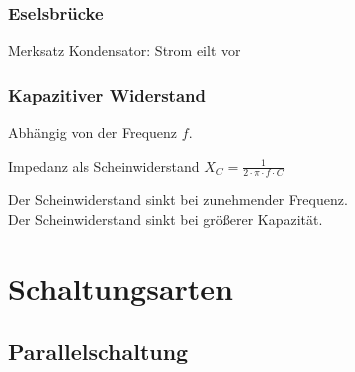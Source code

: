 \begin{frame}
  \frametitle{Eselsbrücke}
  \begin{block}{Merksatz}
    Kondensator: Strom eilt vor
  \end{block}
\end{frame}

\begin{frame}
  \frametitle{Kapazitiver Widerstand}

  Abhängig von der Frequenz $f$.

  \begin{block}{Impedanz als Scheinwiderstand}
    \huge{$X_C = \frac{1}{2 \cdot \pi \cdot f \cdot C}$}
  \end{block}

  \pause
  Der Scheinwiderstand sinkt bei zunehmender Frequenz.\\
  Der Scheinwiderstand sinkt bei größerer Kapazität.
\end{frame}



\section*{Schaltungsarten}

\subsection*{Parallel\-schaltung}

